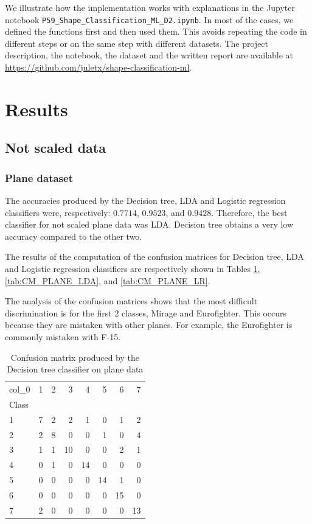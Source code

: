 \documentclass{article} %
\begin{document}
We illustrate how the implementation works with explanations in the Jupyter notebook \texttt{P59\_Shape\_Classification\_ML\_D2.ipynb}. In most of the cases, we defined the functions first and then used them. This avoids repeating the code in different steps or on the same step with different datasets. The project description, the notebook, the dataset and the written report are available at \url{https://github.com/juletx/shape-classification-ml}.

\section{Results}

\subsection{Not scaled data}

\subsubsection{Plane dataset}

The accuracies produced by the Decision tree, LDA and Logistic regression classifiers were, respectively: $0.7714$, $0.9523$, and $0.9428$. Therefore, the best classifier for not scaled plane data was LDA. Decision tree obtains a very low accuracy compared to the other two.

The results of the computation of the confusion matrices for Decision tree, LDA and Logistic regression classifiers are respectively shown in Tables \ref{tab:CM_PLANE_DT}, \ref{tab:CM_PLANE_LDA}, and \ref{tab:CM_PLANE_LR}.

The analysis of the confusion matrices shows that the most difficult discrimination is for the first 2 classes, Mirage and Eurofighter. This occurs because they are mistaken with other planes. For example, the Eurofighter is commonly mistaken with F-15.

\begin{table}
\centering
\begin{tabular}{lrrrrrrr}
\toprule
col\_0 &  1 &  2 &   3 &   4 &   5 &   6 &   7 \\
Class &    &    &     &     &     &     &     \\
\midrule
1     &  7 &  2 &   2 &   1 &   0 &   1 &   2 \\
2     &  2 &  8 &   0 &   0 &   1 &   0 &   4 \\
3     &  1 &  1 &  10 &   0 &   0 &   2 &   1 \\
4     &  0 &  1 &   0 &  14 &   0 &   0 &   0 \\
5     &  0 &  0 &   0 &   0 &  14 &   1 &   0 \\
6     &  0 &  0 &   0 &   0 &   0 &  15 &   0 \\
7     &  2 &  0 &   0 &   0 &   0 &   0 &  13 \\
\bottomrule
\end{tabular}
\caption{Confusion matrix produced by the Decision tree classifier on plane data}
\label{tab:CM_PLANE_DT}
\end{table}
\end{document}
